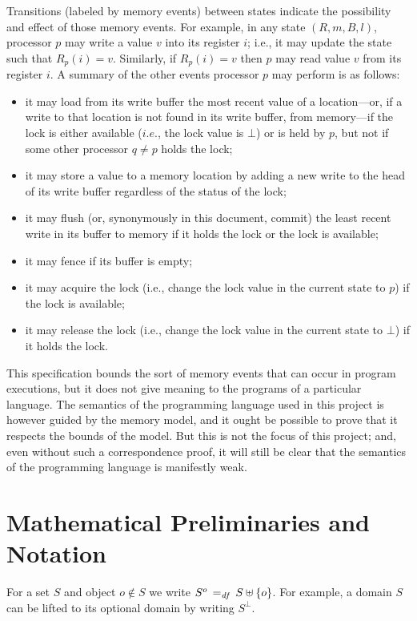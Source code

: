 \documentclass[11pt]{report}
\begin{document}
Transitions (labeled by memory events) between states indicate the possibility and effect of those memory events. For example, in any state $(R,m,B,l)$, processor $p$ may write a value $v$ into its register $i$; i.e., it may update the state such that $R_p(i) = v$. Similarly, if $R_p(i) = v$ then $p$ may read value $v$ from its register $i$. A summary of the other events processor $p$ may perform is as follows: \begin{itemize}
	\item it may load from its write buffer the most recent value of a location---or, if a write to that location is not found in its write buffer, from memory---if the lock is either available ($i.e.$, the lock value is $\bot$) or is held by $p$, but not if some other processor $q \neq p$ holds the lock;
	\item it may store a value to a memory location by adding a new write to the head of its write buffer regardless of the status of the lock; 
	\item it may flush (or, synonymously in this document, commit) the least recent write in its buffer to memory if it holds the lock or the lock is available;  
	\item it may fence if its buffer is empty;
	\item it may acquire the lock (i.e., change the lock value in the current state to $p$) if the lock is available; 
	\item it may release the lock (i.e., change the lock value in the current state to $\bot$) if it holds the lock.
\end{itemize}

This specification bounds the sort of memory events that can occur in program executions, but it does not give meaning to the programs of a particular language. The semantics of the programming language used in this project is however guided by the memory model, and it ought be possible to prove that it respects the bounds of the model. But this is not the focus of this project; and, even without such a correspondence proof, it will still be clear that the semantics of the programming language is manifestly weak. 


\section{Mathematical Preliminaries and Notation}

For a set $S$ and object $o \notin S$ we write $S^o \operatorname{\;=_{\mathit{df}}\;} S \uplus \left\lbrace o \right\rbrace$. For example, a domain $S$ can be lifted to its optional domain by writing $S^\bot$. 
\end{document}
